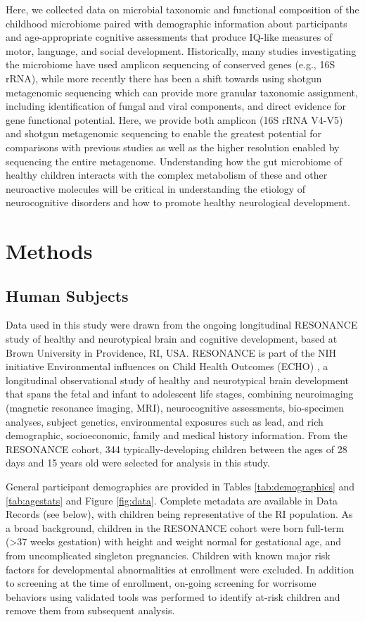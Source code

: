 \documentclass[fleqn,10pt]{wlscirep}
\begin{document}
Here, we collected data on microbial taxonomic and functional composition
of the childhood microbiome paired with demographic information about participants
and age-appropriate cognitive assessments that produce IQ-like measures of motor, language, and social development.
Historically, many studies investigating the microbiome have used amplicon sequencing of conserved genes (e.g., 16S rRNA),
while more recently there has been a shift towards using shotgun metagenomic sequencing
which can provide more granular taxonomic assignment, including identification of fungal and viral components,
and direct evidence for gene functional potential.
Here, we provide both amplicon (16S rRNA V4-V5) and shotgun metagenomic sequencing
to enable the greatest potential for comparisons with previous studies
as well as the higher resolution enabled by sequencing the entire metagenome.
Understanding how the gut microbiome of healthy children
interacts with the complex metabolism of these and other neuroactive molecules
will be critical in understanding the etiology of neurocognitive disorders
and how to promote healthy neurological development.



\section*{Methods}

\subsection*{Human Subjects}

Data used in this study were drawn from the ongoing longitudinal RESONANCE study
of healthy and neurotypical brain and cognitive development,
based at Brown University in Providence, RI, USA.
RESONANCE is part of the NIH initiative Environmental influences on Child Health Outcomes (ECHO) \cite{Forrest2018-ud,Gillman2018-om},
a longitudinal observational study of healthy and neurotypical brain development
that spans the fetal and infant to adolescent life stages,
combining neuroimaging (magnetic resonance imaging, MRI), neurocognitive assessments, bio-specimen analyses, subject genetics,
environmental exposures such as lead, and rich demographic, socioeconomic, family and medical history information.
From the RESONANCE cohort, 344 typically-developing children
between the ages of 28 days and 15 years old were selected for analysis in this study. 

General participant demographics are provided in Tables \ref{tab:demographics} and \ref{tab:agestats} and Figure \ref{fig:data}.
Complete metadata are available in Data Records (see below), with children being representative of the RI population.
As a broad background, children in the RESONANCE cohort were born full-term (>37 weeks gestation)
with height and weight normal for gestational age, and from uncomplicated singleton pregnancies.
Children with known major risk factors for developmental abnormalities at enrollment were excluded.
In addition to screening at the time of enrollment,
on-going screening for worrisome behaviors using validated tools was performed
to identify at-risk children and remove them from subsequent analysis.
\end{document}
